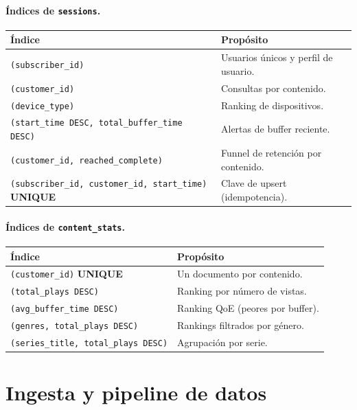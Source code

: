 \documentclass[12pt, letterpaper]{article}
\newcommand{\code}[1]{\texttt{#1}}
\begin{document}
\paragraph{Índices de \code{sessions}.}
\begin{center}
\begin{tabular}{@{}lL{7.5cm}@{}}
\toprule
\textbf{Índice} & \textbf{Propósito} \\
\midrule
\code{(subscriber\_id)} & Usuarios únicos y perfil de usuario. \\
\code{(customer\_id)} & Consultas por contenido. \\
\code{(device\_type)} & Ranking de dispositivos. \\
\code{(start\_time DESC, total\_buffer\_time DESC)} & Alertas de buffer reciente. \\
\code{(customer\_id, reached\_complete)} & Funnel de retención por contenido. \\
\code{(subscriber\_id, customer\_id, start\_time)} \textbf{UNIQUE} & Clave de upsert (idempotencia). \\
\bottomrule
\end{tabular}
\end{center}

\paragraph{Índices de \code{content\_stats}.}
\begin{center}
\begin{tabular}{@{}lL{7.5cm}@{}}
\toprule
\textbf{Índice} & \textbf{Propósito} \\
\midrule
\code{(customer\_id)} \textbf{UNIQUE} & Un documento por contenido. \\
\code{(total\_plays DESC)} & Ranking por número de vistas. \\
\code{(avg\_buffer\_time DESC)} & Ranking QoE (peores por buffer). \\
\code{(genres, total\_plays DESC)} & Rankings filtrados por género. \\
\code{(series\_title, total\_plays DESC)} & Agrupación por serie. \\
\bottomrule
\end{tabular}
\end{center}

\section{Ingesta y pipeline de datos}
\end{document}
